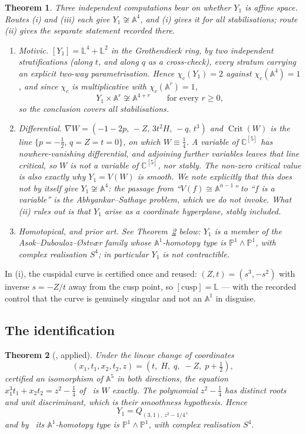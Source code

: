 \documentclass[11pt]{article}
\newtheorem{theorem}{Theorem}[section]
\theoremstyle{definition}
\theoremstyle{remark}
\newcommand{\C}{\mathbb{C}}
\newcommand{\Aff}[1]{\mathbb{A}^{#1}}
\newcommand{\Lef}{\mathbb{L}}
\newcommand{\PP}{\mathbb{P}}
\newcommand{\Crit}{\operatorname{Crit}}
\newcommand{\chic}{\chi_c}
\begin{document}
\begin{theorem}\label{thm:Y1kills}
Three independent computations bear on whether $Y_1$ is affine space. Routes
(i) and (iii) each give $Y_1\not\cong\Aff{4}$, and (i) gives it for all
stabilisations; route (ii) gives the separate statement recorded there.
\begin{enumerate}
\item[(i)] \emph{Motivic.} $[Y_1]=\Lef^4+\Lef^2$ in the Grothendieck ring, by
two independent stratifications (along $t$, and along $q$ as a cross-check),
every stratum carrying an explicit two-way parametrisation. Hence
$\chic(Y_1)=2$ against $\chic(\Aff{4})=1$, and since $\chic$ is multiplicative
with $\chic(\Aff{r})=1$,
\[
Y_1\times\Aff{r}\not\cong\Aff{4+r}\qquad\text{for every }r\ge0,
\]
so the conclusion covers all stabilisations.
\item[(ii)] \emph{Differential.} $\nabla W=(-1-2p,\,-Z,\,3t^2H,\,-q,\,t^3)$
and $\Crit(W)$ is the line $\{p=-\tfrac12,\,q=Z=t=0\}$, on which
$W\equiv\tfrac14$. A variable of $\C^{[5]}$ has nowhere-vanishing
differential, and adjoining further variables leaves that line critical, so
$W$ is not a variable of $\C^{[5]}$, nor stably. The non-zero critical value
is also exactly why $Y_1=V(W)$ is smooth. We note explicitly that this does
not by itself give $Y_1\not\cong\Aff{4}$: the passage from ``$V(f)\cong
\Aff{n-1}$'' to ``$f$ is a variable'' is the Abhyankar--Sathaye problem, which
we do not invoke. What (ii) rules out is that $Y_1$ arise as a coordinate
hyperplane, stably included.
\item[(iii)] \emph{Homotopical, and prior art.} See
Theorem~\ref{thm:ADO} below: $Y_1$ is a member of the
Asok--Dubouloz--{\O}stv{\ae}r family whose $\Aff{1}$-homotopy type is
$\PP^1\wedge\PP^1$, with complex realisation $S^4$; in particular $Y_1$ is not
contractible.
\end{enumerate}
\end{theorem}

In (i), the cuspidal curve is certified once and reused: $(Z,t)=(s^3,-s^2)$
with inverse $s=-Z/t$ away from the cusp point, so $[\text{cusp}]=\Lef$ ---
with the recorded control that the curve is genuinely singular and not an
$\Aff{1}$ in disguise.

\subsection{The identification}

\begin{theorem}[\cite{ADO2021}, applied]\label{thm:ADO}
Under the linear change of coordinates
\begin{equation}\label{eq:ADO}
(x_1,t_1,x_2,t_2,z)=(t,\;H,\;q,\;-Z,\;p+\tfrac12),
\end{equation}
certified an isomorphism of $\Aff{5}$ in both directions, the equation
$x_1^3t_1+x_2t_2=z^2-\tfrac14$ of~\cite[Ex.~4.2.5]{ADO2021} \emph{is} $W$
exactly. The polynomial $z^2-\tfrac14$ has distinct roots and unit
discriminant, which is their smoothness hypothesis. Hence
\[
Y_1=Q_{(3,1),\,z^2-1/4},
\]
and by~\cite{ADO2021} its $\Aff{1}$-homotopy type is $\PP^1\wedge\PP^1$, with
complex realisation $S^4$.
\end{theorem}
\end{document}
